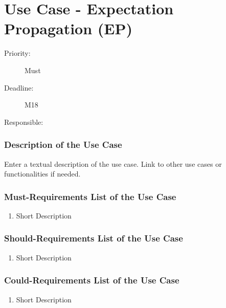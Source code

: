 \newpage
\section{Use Case - Expectation Propagation (EP)}
\label{UseCase:EP}

\begin{description}
\item[Priority:] Must
\item[Deadline:] M18
\item[Responsible:]
\end{description}

\subsubsection*{Description of the Use Case}

Enter a textual description of the use case. Link to other use cases or functionalities if needed. 


\subsubsection*{Must-Requirements List of the Use Case}

\begin{enumerate}
\item Short Description
\end{enumerate}

\subsubsection*{Should-Requirements List of the Use Case}

\begin{enumerate}
\item Short Description
\end{enumerate}

\subsubsection*{Could-Requirements List of the Use Case}

\begin{enumerate}
\item Short Description
\end{enumerate}


